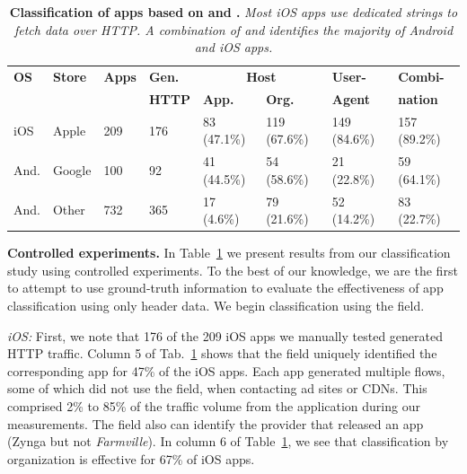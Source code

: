 \begin{table} 
     \centering
     \begin{small}
     \begin{tabular}{|p{}|p{}|p{}|p{}|p{}|p{}|p{}|p{}|}
        \hline
        {\bf OS}&{\bf Store}&{\bf Apps}&{\bf Gen.}&\multicolumn{2}{|c|}{\bf Host} & {\bf User-}&{\bf Combi-} \tabularnewline
        \cline{5-6}    
             &        &     & {\bf HTTP} & {\bf App. } & {\bf Org.}& \bf{Agent}   & \bf{nation}  \tabularnewline                
        \hline    
        iOS  & Apple  & 209 & 176 & 83 (47.1\%)  &  119 (67.6\%)   &  149 (84.6\%)& 157 (89.2\%) \tabularnewline
        \hline
        And. & Google & 100 & 92  & 41 (44.5\%)  &  54 (58.6\%)    &  21 (22.8\%) &  59 (64.1\%)  \tabularnewline
        \hline    
        And. & Other  & 732 &  365 &  17 (4.6\%) &  79 (21.6\%)    &  52 (14.2\%)  & 83 (22.7\%)  \tabularnewline
        \hline
     \end{tabular}
     \end{small}
     \caption{\textbf{Classification of apps based on \httphost and \useragent.} \emph{ Most iOS apps use dedicated \useragent strings to fetch data over HTTP. A combination of \useragent and \httphost identifies the majority of Android and iOS apps.}}
     \label{tab:classification-success}
\vspace{\postfigspace}
\end{table}



\noindent\textbf{Controlled experiments.}
In Table~\ref{tab:classification-success} we present results from our classification study using controlled experiments. To 
the best of our knowledge, we are the first to attempt to use ground-truth information to evaluate the 
effectiveness of app classification using only header data. We begin classification using the \httphost field.

\emph{iOS:}
First, we note that 176 of the 209 iOS apps we manually tested generated HTTP traffic.
Column 5 of Tab.~\ref{tab:classification-success} shows that the \httphost field uniquely identified 
the corresponding app for 47\% of the iOS apps. Each app generated multiple flows, some of which did not use the 
\httphost field, \eg when contacting ad sites or CDNs. This comprised 2\% to 85\% of the traffic volume from the application during  our measurements. 
The \httphost field also can identify the provider that released an app (\eg Zynga but not \emph{Farmville}).
In column 6 of Table~\ref{tab:classification-success}, we see that classification by organization is effective for 67\% of iOS apps. 

